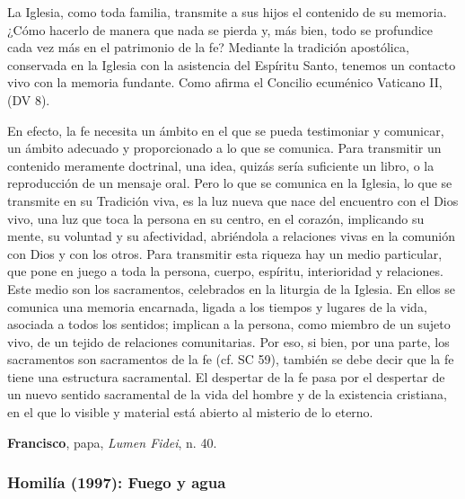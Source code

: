 \begin{patercite}
	La Iglesia, como toda familia, transmite a sus hijos el contenido de su memoria. ¿Cómo hacerlo de manera que nada se pierda y, más bien, todo se profundice cada vez más en el patrimonio de la fe? Mediante la tradición apostólica, conservada en la Iglesia con la asistencia del Espíritu Santo, tenemos un contacto vivo con la memoria fundante. Como afirma el Concilio ecuménico Vaticano II,  (DV 8). 
	
	En efecto, la fe necesita un ámbito en el que se pueda testimoniar y comunicar, un ámbito adecuado y proporcionado a lo que se comunica. Para transmitir un contenido meramente doctrinal, una idea, quizás sería suficiente un libro, o la reproducción de un mensaje oral. Pero lo que se comunica en la Iglesia, lo que se transmite en su Tradición viva, es la luz nueva que nace del encuentro con el Dios vivo, una luz que toca la persona en su centro, en el corazón, implicando su mente, su voluntad y su afectividad, abriéndola a relaciones vivas en la comunión con Dios y con los otros. Para transmitir esta riqueza hay un medio particular, que pone en juego a toda la persona, cuerpo, espíritu, interioridad y relaciones. Este medio son los sacramentos, celebrados en la liturgia de la Iglesia. En ellos se comunica una memoria encarnada, ligada a los tiempos y lugares de la vida, asociada a todos los sentidos; implican a la persona, como miembro de un sujeto vivo, de un tejido de relaciones comunitarias. Por eso, si bien, por una parte, los sacramentos son sacramentos de la fe (cf. SC 59), también se debe decir que la fe tiene una estructura sacramental. El despertar de la fe pasa por el despertar de un nuevo sentido sacramental de la vida del hombre y de la existencia cristiana, en el que lo visible y material está abierto al misterio de lo eterno.
	
	\textbf{Francisco}, papa, \textit{Lumen Fidei}, n. 40.
\end{patercite}

\newpage 

\subsubsection{Homilía (1997): Fuego y agua}

